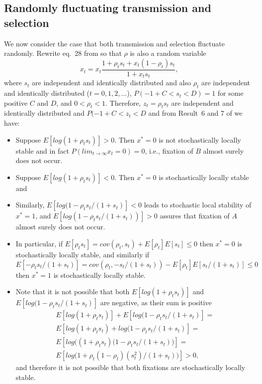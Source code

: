 \documentclass[12pt]{extarticle} %
\begin{document}
\subsection*{Randomly fluctuating transmission and selection}

We now consider the case that both transmission and selection fluctuate randomly.
Rewrite eq.~28 from \citet{Ram2018} so that $\rho$ is also a random variable
\begin{equation}
x_t = x_t \frac{1 + \rho_t s_t + x_t (1 - \rho_t) s_t}{1 + x_t s_t},
\end{equation}
where $s_t$ are independent and identically distributed and also $\rho_t$ are independent and identically distributed ($t=0,1,2,\ldots$), $P(-1+C<s_t<D)=1$ for some positive $C$ and $D$, and $0<\rho_t<1$.
Therefore, $z_t = \rho_t s_t$  are independent and identically distributed and $P(-1+C < z_t < D$ and from Result~6 and 7 of \citet{Ram2018} we have:
\begin{itemize}
\item Suppose $E[log(1+\rho_t s_t)]>0$. Then $x^*=0$ is not stochastically locally stable and in fact $P(lim_{t \to \infty} x_t=0) = 0$, i.e., fixation of $B$ almost surely does not occur.
\item Suppose $E[log(1+\rho_t s_t)]<0$. Then $x^*=0$ is stochastically locally stable and 
\item Similarly, $E[log(1-\rho_t s_t/(1+s_t)]<0$ leads to stochastic local stability of $x^*=1$, and $E[log(1-\rho_t s_t/(1+s_t))]>0$ assures that fixation of $A$ almost surely does not occur.
\item In particular, if $E[\rho_t s_t] = cov(\rho_t, s_t) + E[\rho_t] E[s_t] \le 0$ then $x^*=0$ is stochastically locally stable, and similarly if $E[-\rho_t s_t/(1+s_t)] = cov(\rho_t, -s_t/(1+s_t)) - E[\rho_t] E[s_t/(1+s_t)] \le 0$ then $x^*=1$ is stochastically locally stable.
\item Note that it is not possible that both $E[log(1+\rho_t s_t)]$ and $E[log(1-\rho_t s_t/(1+s_t)]$ are negative, as their sum is positive
\begin{multline}
E[log(1+\rho_t s_t)] + E[log(1-\rho_t s_t/(1+s_t)] = \\
E[log(1+\rho_t s_t) + log(1-\rho_t s_t/(1+s_t)]= \\
E[log\big((1+\rho_t s_t)(1-\rho_t s_t/(1+s_t)\big)]= \\
E[log\big( 1+\rho_t(1-\rho_t)(s_t^2)/(1+s_t) \big)] > 0,
\end{multline}
and therefore it is not possible that both fixations are stochastically locally stable.
\end{itemize}
\end{document}
